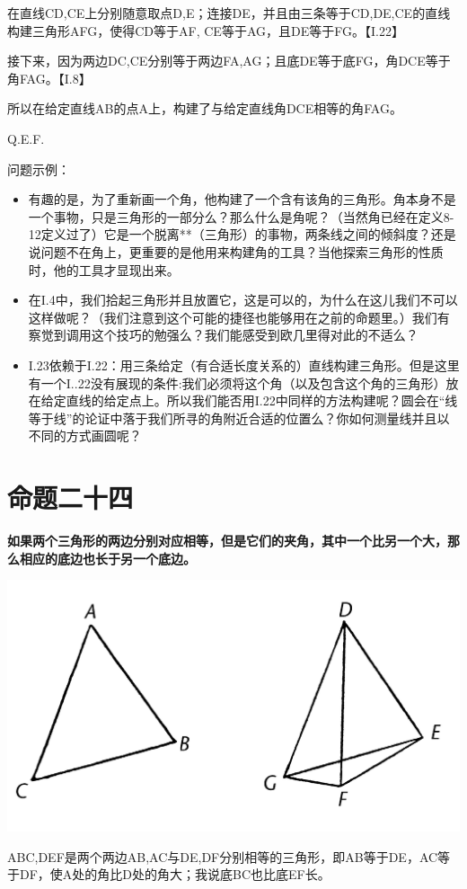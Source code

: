 \documentclass[
]{book}
\providecommand{\tightlist}{%
  \setlength{\itemsep}{0pt}\setlength{\parskip}{0pt}}
\begin{document}
在直线CD,CE上分别随意取点D,E；连接DE，并且由三条等于CD,DE,CE的直线构建三角形AFG，使得CD等于AF, CE等于AG，且DE等于FG。【I.22】

接下来，因为两边DC,CE分别等于两边FA,AG；且底DE等于底FG，角DCE等于角FAG。【I.8】

所以在给定直线AB的点A上，构建了与给定直线角DCE相等的角FAG。

Q.E.F.

问题示例：

\begin{itemize}
\tightlist
\item
  有趣的是，为了重新画一个角，他构建了一个含有该角的三角形。角本身不是一个事物，只是三角形的一部分么？那么什么是角呢？（当然角已经在定义8-12定义过了）它是一个脱离**（三角形）的事物，两条线之间的倾斜度？还是说问题不在角上，更重要的是他用来构建角的工具？当他探索三角形的性质时，他的工具才显现出来。
\item
  在I.4中，我们拾起三角形并且放置它，这是可以的，为什么在这儿我们不可以这样做呢？（我们注意到这个可能的捷径也能够用在之前的命题里。）我们有察觉到调用这个技巧的勉强么？我们能感受到欧几里得对此的不适么？
\item
  I.23依赖于I.22：用三条给定（有合适长度关系的）直线构建三角形。但是这里有一个I..22没有展现的条件:我们必须将这个角（以及包含这个角的三角形）放在给定直线的给定点上。所以我们能否用I.22中同样的方法构建呢？圆会在``线等于线''的论证中落于我们所寻的角附近合适的位置么？你如何测量线并且以不同的方式画圆呢？
\end{itemize}

\hypertarget{ux547dux9898ux4e8cux5341ux56db}{%
\section{命题二十四}\label{ux547dux9898ux4e8cux5341ux56db}}

\textbf{如果两个三角形的两边分别对应相等，但是它们的夹角，其中一个比另一个大，那么相应的底边也长于另一个底边。}

\includegraphics[width=0.5\linewidth]{./image/img499}

ABC,DEF是两个两边AB,AC与DE,DF分别相等的三角形，即AB等于DE，AC等于DF，使A处的角比D处的角大；我说底BC也比底EF长。
\end{document}
